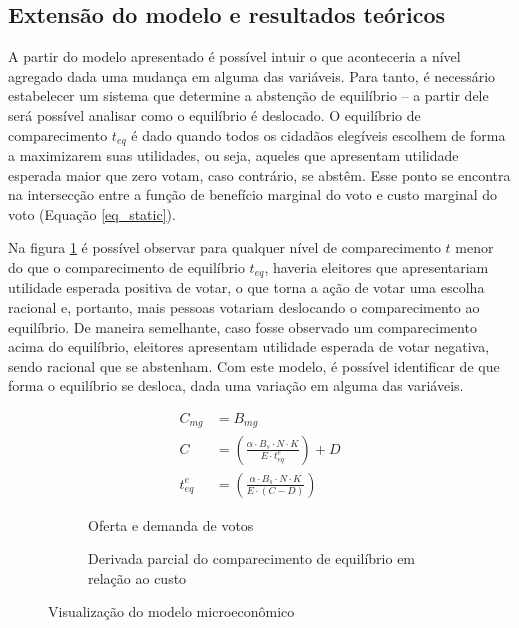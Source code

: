 \subsection{Extensão do modelo e resultados teóricos}

A partir do modelo apresentado é possível intuir o que aconteceria a nível agregado dada uma mudança em alguma das variáveis. Para tanto, é necessário estabelecer um sistema que determine a abstenção de equilíbrio -- a partir dele será possível analisar como o equilíbrio é deslocado. O equilíbrio de comparecimento $t_{eq}$ é dado quando todos os cidadãos elegíveis escolhem de forma a maximizarem suas utilidades, ou seja, aqueles que apresentam utilidade esperada maior que zero votam, caso contrário, se abstêm. Esse ponto se encontra na intersecção entre a função de benefício marginal do voto e custo marginal do voto (Equação \ref{eq_static}). 

Na figura \ref{fig_static1} é possível observar para qualquer nível de comparecimento $t$ menor do que o comparecimento de equilíbrio $t_{eq}$, haveria eleitores que apresentariam utilidade esperada positiva de votar, o que torna a ação de votar uma escolha racional e, portanto, mais pessoas votariam deslocando o comparecimento ao equilíbrio. De maneira semelhante, caso fosse observado um comparecimento acima do equilíbrio, eleitores apresentam utilidade esperada de votar negativa, sendo racional que se abstenham. Com este modelo, é possível identificar de que forma o equilíbrio se desloca, dada uma variação em alguma das variáveis.

\begin{equation}
\label{eq_static}
\begin{aligned}
    C_{mg}&= B_{mg}\\
    C &=\left(\frac{\alpha\cdot B_s\cdot N\cdot K}{E\cdot t_{eq}^e}\right)+D \\
    t_{eq}^e&=\left(\frac{\alpha\cdot B_s\cdot N\cdot K}{E\cdot (C-D)}\right)
\end{aligned}
\end{equation}

\begin{figure}[!ht]
    \begin{subfigure}[t]{0.45\linewidth}
      
      \caption{Oferta e demanda de votos}
      \label{fig_static1}
    \end{subfigure}
    \hfill
    \begin{subfigure}[t]{0.45\linewidth}
      
      \caption{Derivada parcial do comparecimento de equilíbrio em relação ao custo}
      \label{fig_static2}
    \end{subfigure}
    \caption{Visualização do modelo microeconômico}
    \label{fig_staticA}
  \end{figure}

